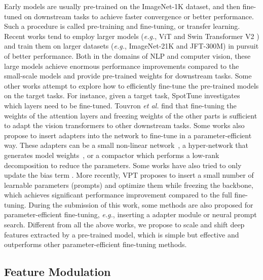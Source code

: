 Early models \cite{he2016deep, huang2017densely, howard2017mobilenets, Xie_2017_CVPR, tan2019efficientnet} are usually pre-trained on the ImageNet-1K dataset, and then fine-tuned on downstream tasks to achieve faster convergence \cite{he2019rethinking} or better performance. Such a procedure is called pre-training and fine-tuning, or transfer learning. Recent works tend to employ larger models (\emph{e.g.}, ViT \cite{dosovitskiy2020image} and Swin Transformer V2 \cite{liu2021swin}) and train them on larger datasets (\emph{e.g.}, ImageNet-21K and JFT-300M) in pursuit of better performance. Both in the domains of NLP and computer vision, these large models \cite{devlin2018bert, liu2021swin, radford2021learning, he2022masked, zhou2021deepvit, zhou2022understanding} achieve enormous performance improvements compared to the small-scale models and provide pre-trained weights for downstream tasks. Some other works attempt to explore how to efficiently fine-tune the pre-trained models \cite{guo2019spottune,zhou2021learning} on the target tasks. For instance, given a target task, SpotTune \cite{guo2019spottune} investigates which layers need to be fine-tuned. Touvron \emph{et al.} \cite{touvron2022three} find that fine-tuning the weights of the attention layers and freezing weights of the other parts is sufficient to adapt the vision transformers to other downstream tasks. Some works also propose to insert adapters into the network to fine-tune in a parameter-efficient way. These adapters can be a small non-linear network~\cite{houlsby2019parameter}, a hyper-network that generates model weights~\cite{mahabadi2021parameter}, or a compactor \cite{mahabadi2021compacter} which performs a low-rank decomposition to reduce the parameters. Some works have also tried to only update the bias term \cite{NEURIPS2020_81f7acab, zaken2021bitfit}. More recently, VPT \cite{jia2022visual} proposes to insert a small number of learnable parameters (prompts) and optimize them while freezing the backbone, which achieves significant performance improvement compared to the full fine-tuning. During the submission of this work, some methods \cite{chen2022adaptformer, zhang2022neural} are also proposed for parameter-efficient fine-tuning, \emph{e.g.}, inserting a adapter module or neural prompt search. Different from all the above works, we propose to scale and shift deep features extracted by a pre-trained model, which is simple but effective and outperforms other parameter-efficient fine-tuning methods. 

\subsection{Feature Modulation}

